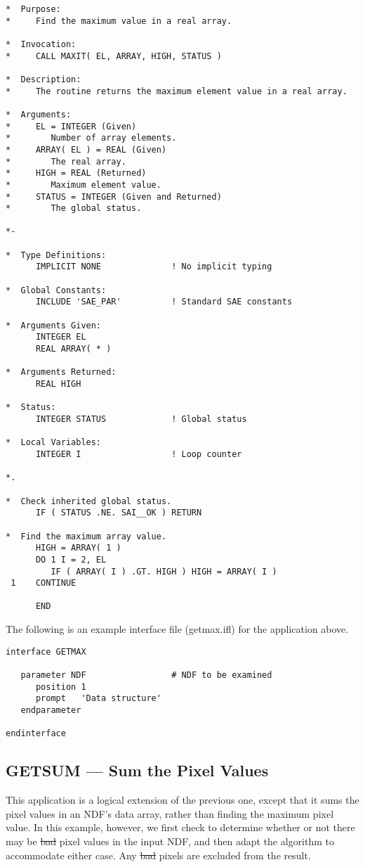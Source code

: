 \begin{verbatim}
*  Purpose:
*     Find the maximum value in a real array.

*  Invocation:
*     CALL MAXIT( EL, ARRAY, HIGH, STATUS )

*  Description:
*     The routine returns the maximum element value in a real array.

*  Arguments:
*     EL = INTEGER (Given)
*        Number of array elements.
*     ARRAY( EL ) = REAL (Given)
*        The real array.
*     HIGH = REAL (Returned)
*        Maximum element value.
*     STATUS = INTEGER (Given and Returned)
*        The global status.

*-
      
*  Type Definitions:
      IMPLICIT NONE              ! No implicit typing

*  Global Constants:
      INCLUDE 'SAE_PAR'          ! Standard SAE constants

*  Arguments Given:
      INTEGER EL
      REAL ARRAY( * )

*  Arguments Returned:
      REAL HIGH

*  Status:
      INTEGER STATUS             ! Global status

*  Local Variables:
      INTEGER I                  ! Loop counter

*.

*  Check inherited global status.
      IF ( STATUS .NE. SAI__OK ) RETURN

*  Find the maximum array value.
      HIGH = ARRAY( 1 )
      DO 1 I = 2, EL
         IF ( ARRAY( I ) .GT. HIGH ) HIGH = ARRAY( I )
 1    CONTINUE

      END
\end{verbatim}
\normalsize

The following is an example  interface file
(getmax.ifl) for the application above.

\small
\begin{verbatim}
interface GETMAX

   parameter NDF                 # NDF to be examined
      position 1
      prompt   'Data structure'
   endparameter

endinterface
\end{verbatim}
\normalsize

\newpage
\subsection{GETSUM --- Sum the Pixel Values}

This application is a logical extension of the previous one, except that it sums
the pixel values in an NDF's data array, rather than finding the maximum pixel
value. In this example, however, we first check to determine whether or not
there may be \st{bad\/} pixel values in the input NDF, and then adapt the
algorithm to accommodate either case. Any \st{bad\/} pixels are excluded from
the result.

